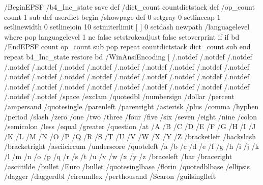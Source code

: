 /BeginEPSF { %
/b4_Inc_state save def         %
/dict_count countdictstack def %
/op_count count 1 sub def      %
userdict begin                 %
/showpage { } def              %
0 setgray 0 setlinecap         %
1 setlinewidth 0 setlinejoin
10 setmiterlimit [ ] 0 setdash newpath
/languagelevel where           %
{pop languagelevel             %
1 ne                           %
{false setstrokeadjust false setoverprint
} if
} if
} bd
/EndEPSF { %
count op_count sub {pop} repeat            %
countdictstack dict_count sub {end} repeat
b4_Inc_state restore
} bd
/WinAnsiEncoding [
/.notdef /.notdef /.notdef /.notdef /.notdef
/.notdef /.notdef /.notdef /.notdef /.notdef
/.notdef /.notdef /.notdef /.notdef /.notdef
/.notdef /.notdef /.notdef /.notdef /.notdef
/.notdef /.notdef /.notdef /.notdef /.notdef
/.notdef /.notdef /.notdef /.notdef /.notdef
/.notdef /.notdef /space /exclam /quotedbl
/numbersign /dollar /percent /ampersand /quotesingle
/parenleft /parenright /asterisk /plus /comma
/hyphen /period /slash /zero /one
/two /three /four /five /six
/seven /eight /nine /colon /semicolon
/less /equal /greater /question /at
/A /B /C /D /E
/F /G /H /I /J
/K /L /M /N /O
/P /Q /R /S /T
/U /V /W /X /Y
/Z /bracketleft /backslash /bracketright /asciicircum
/underscore /quoteleft /a /b /c
/d /e /f /g /h
/i /j /k /l /m
/n /o /p /q /r
/s /t /u /v /w
/x /y /z /braceleft /bar
/braceright /asciitilde /bullet /Euro /bullet
/quotesinglbase /florin /quotedblbase /ellipsis /dagger
/daggerdbl /circumflex /perthousand /Scaron /guilsinglleft
